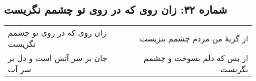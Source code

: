 \begin{center}
\section*{شماره ۳۲: زان روی که در روی تو چشمم نگریست}
\label{sec:032}
\begin{longtable}{l p{0.5cm} r}
زان روی که در روی تو چشمم نگریست
&&
از گریهٔ من مردم چشمم بنزیست
\\
جان بر سر آتش است و دل بر سر آب
&&
از بس که دلم بسوخت و چشمم بگریست
\\
\end{longtable}
\end{center}
